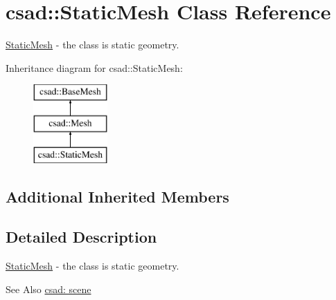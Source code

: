 \hypertarget{classcsad_1_1_static_mesh}{\section{csad\-:\-:Static\-Mesh Class Reference}
\label{classcsad_1_1_static_mesh}
}


\hyperlink{classcsad_1_1_static_mesh}{Static\-Mesh} -\/ the class is static geometry.  


Inheritance diagram for csad\-:\-:Static\-Mesh\-:\begin{figure}[H]
\begin{center}
\leavevmode
\includegraphics[height=3.000000cm]{classcsad_1_1_static_mesh}
\end{center}
\end{figure}
\subsection*{Additional Inherited Members}


\subsection{Detailed Description}
\hyperlink{classcsad_1_1_static_mesh}{Static\-Mesh} -\/ the class is static geometry. 

\begin{DoxySeeAlso}{See Also}
\hyperlink{group__scene}{csad\-: scene} 
\end{DoxySeeAlso}
